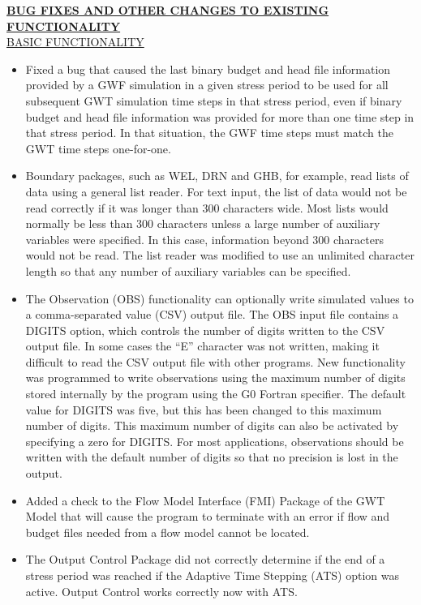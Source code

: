 	\textbf{\underline{BUG FIXES AND OTHER CHANGES TO EXISTING FUNCTIONALITY}} \\
	\underline{BASIC FUNCTIONALITY}
	\begin{itemize}
	        \item Fixed a bug that caused the last binary budget and head file information provided by a GWF simulation in a given stress period to be used for all subsequent GWT simulation time steps in that stress period, even if binary budget and head file information was provided for more than one time step in that stress period. In that situation, the GWF time steps must match the GWT time steps one-for-one.
	        \item Boundary packages, such as WEL, DRN and GHB, for example, read lists of data using a general list reader.  For text input, the list of data would not be read correctly if it was longer than 300 characters wide.  Most lists would normally be less than 300 characters unless a large number of auxiliary variables were specified.  In this case, information beyond 300 characters would not be read.  The list reader was modified to use an unlimited character length so that any number of auxiliary variables can be specified.
	        \item The Observation (OBS) functionality can optionally write simulated values to a comma-separated value (CSV) output file.  The OBS input file contains a DIGITS option, which controls the number of digits written to the CSV output file.  In some cases the ``E'' character was not written, making it difficult to read the CSV output file with other programs.  New functionality was programmed to write observations using the maximum number of digits stored internally by the program using the G0 Fortran specifier.  The default value for DIGITS was five, but this has been changed to this maximum number of digits.  This maximum number of digits can also be activated by specifying a zero for DIGITS.  For most applications, observations should be written with the default number of digits so that no precision is lost in the output.
	        \item Added a check to the Flow Model Interface (FMI) Package of the GWT Model that will cause the program to terminate with an error if flow and budget files needed from a flow model cannot be located.
	        \item The Output Control Package did not correctly determine if the end of a stress period was reached if the Adaptive Time Stepping (ATS) option was active.  Output Control works correctly now with ATS.

\end{itemize}
